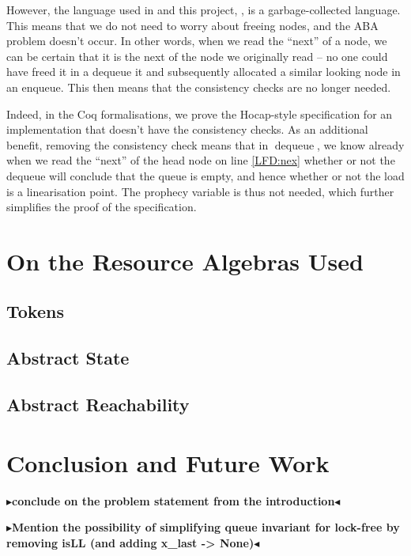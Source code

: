 \documentclass[a4paper, 10pt]{report}
\theoremstyle{definition}
\newcommand{\dequeue}{\operatorname{dequeue}}
\newcommand{\todo}[1]{{\color[rgb]{.5,0,0}\textbf{$\blacktriangleright$#1$\blacktriangleleft$}}}
\begin{document}
However, the language used in \citet{DBLP:conf/cpp/VindumB21} and this project, \heaplang, is a garbage-collected language. This means that we do not need to worry about freeing nodes, and the ABA problem doesn't occur. In other words, when we read the ``next'' of a node, we can be certain that it is the next of the node we originally read -- no one could have freed it in a dequeue it and subsequently allocated a similar looking node in an enqueue. This then means that the consistency checks are no longer needed. 

Indeed, in the Coq formalisations, we prove the Hocap-style specification for an implementation that doesn't have the consistency checks. As an additional benefit, removing the consistency check means that in $\dequeue$, we know already when we read the ``next'' of the head node on line \ref{LFD:nex} whether or not the dequeue will conclude that the queue is empty, and hence whether or not the load is a linearisation point. The prophecy variable is thus not needed, which further simplifies the proof of the specification.


\chapter{On the Resource Algebras Used}
\section{Tokens}

\section{Abstract State}
\section{Abstract Reachability}


\chapter{Conclusion and Future Work}
\label{ch:conclusion_fw}

\todo{conclude on the problem statement from the introduction}

\todo{Mention the possibility of simplifying queue invariant for lock-free by removing isLL (and adding x\_last -> None)}
\end{document}
